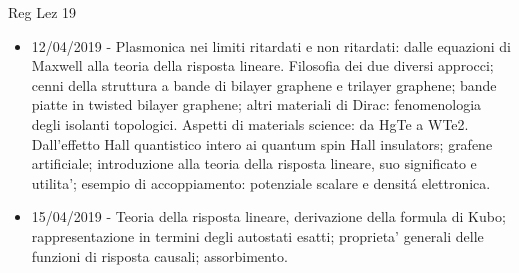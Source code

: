 \begin{frame}[allowframebreaks]{Reg Lez 19}
\begin{itemize}
    \item 12/04/2019 - Plasmonica nei limiti ritardati e non ritardati: dalle equazioni di Maxwell alla teoria della risposta lineare. Filosofia dei due diversi approcci; cenni della struttura a bande di bilayer graphene e trilayer graphene; bande piatte in twisted bilayer graphene; altri materiali di Dirac: fenomenologia degli isolanti topologici. Aspetti di materials science: da HgTe a WTe2. Dall’effetto Hall quantistico intero ai quantum spin Hall insulators; grafene artificiale; introduzione alla teoria della risposta lineare, suo significato e utilita’; esempio di accoppiamento: potenziale scalare e densit\'a elettronica. 
    \item 15/04/2019 - Teoria della risposta lineare, derivazione della formula di Kubo; rappresentazione in termini degli autostati esatti; proprieta’ generali delle funzioni di risposta causali; assorbimento.
\end{itemize}
\end{frame}